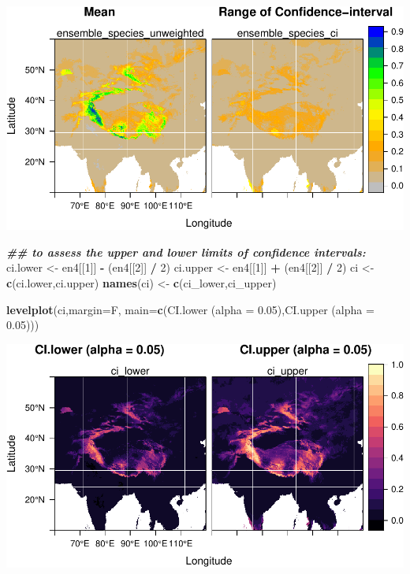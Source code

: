 \documentclass[
]{article}
\newenvironment{Shaded}{\begin{snugshade}}{\end{snugshade}}
\newcommand{\AttributeTok}[1]{\textcolor[rgb]{0.13,0.29,0.53}{#1}}
\newcommand{\DecValTok}[1]{\textcolor[rgb]{0.00,0.00,0.81}{#1}}
\newcommand{\DocumentationTok}[1]{\textcolor[rgb]{0.56,0.35,0.01}{\textbf{\textit{#1}}}}
\newcommand{\FunctionTok}[1]{\textcolor[rgb]{0.13,0.29,0.53}{\textbf{#1}}}
\newcommand{\NormalTok}[1]{#1}
\newcommand{\OtherTok}[1]{\textcolor[rgb]{0.56,0.35,0.01}{#1}}
\newcommand{\SpecialCharTok}[1]{\textcolor[rgb]{0.81,0.36,0.00}{\textbf{#1}}}
\newcommand{\StringTok}[1]{\textcolor[rgb]{0.31,0.60,0.02}{#1}}
\begin{document}
\includegraphics{sdm_R_files/figure-latex/unnamed-chunk-10-2.pdf}

\begin{Shaded}
\begin{Highlighting}[]
\DocumentationTok{\#\# to assess the upper and lower limits of confidence intervals:}
\NormalTok{ci.lower }\OtherTok{\textless{}{-}}\NormalTok{ en4[[}\DecValTok{1}\NormalTok{]] }\SpecialCharTok{{-}}\NormalTok{ (en4[[}\DecValTok{2}\NormalTok{]] }\SpecialCharTok{/} \DecValTok{2}\NormalTok{)}
\NormalTok{ci.upper }\OtherTok{\textless{}{-}}\NormalTok{ en4[[}\DecValTok{1}\NormalTok{]] }\SpecialCharTok{+}\NormalTok{ (en4[[}\DecValTok{2}\NormalTok{]] }\SpecialCharTok{/} \DecValTok{2}\NormalTok{)}
\NormalTok{ci }\OtherTok{\textless{}{-}} \FunctionTok{c}\NormalTok{(ci.lower,ci.upper)}
\FunctionTok{names}\NormalTok{(ci) }\OtherTok{\textless{}{-}} \FunctionTok{c}\NormalTok{(}\StringTok{\textquotesingle{}ci\_lower\textquotesingle{}}\NormalTok{,}\StringTok{\textquotesingle{}ci\_upper\textquotesingle{}}\NormalTok{)}

\FunctionTok{levelplot}\NormalTok{(ci,}\AttributeTok{margin=}\NormalTok{F,}
          \AttributeTok{main=}\FunctionTok{c}\NormalTok{(}\StringTok{\textquotesingle{}CI.lower (alpha = 0.05)\textquotesingle{}}\NormalTok{,}\StringTok{\textquotesingle{}CI.upper (alpha = 0.05)\textquotesingle{}}\NormalTok{))}
\end{Highlighting}
\end{Shaded}

\includegraphics{sdm_R_files/figure-latex/unnamed-chunk-10-3.pdf}
\end{document}
